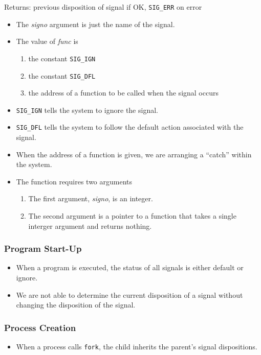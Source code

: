\documentclass[]{article}
\newcommand{\code}{\texttt}
\begin{document}
Returns: previous disposition of signal if OK, \code{SIG\_ERR} on error

\begin{itemize}
\item The \emph{signo} argument is just the name of the signal.
\item The value of \emph{func} is
\begin{enumerate}
\item the constant \code{SIG\_IGN}
\item the constant \code{SIG\_DFL}
\item the address of a function to be called when the signal occurs
\end{enumerate}
\item \code{SIG\_IGN} tells the system to ignore the signal.
\item \code{SIG\_DFL} tells the system to follow the default action associated
with the signal.
\item When the address of a function is given, we are arranging a ``catch''
within the system.
\item The function requires two arguments
\begin{enumerate}
\item The first argument, \emph{signo}, is an integer.
\item The second argument is a pointer to a function that takes a single
interger argument and returns nothing.
\end{enumerate}
\end{itemize}

\subsubsection*{Program Start-Up}
\begin{itemize}
\item When a program is executed, the status of all signals is either default or
ignore.
\item We are not able to determine the current disposition of a signal without
changing the disposition of the signal.
\end{itemize}

\subsubsection*{Process Creation}
\begin{itemize}
\item When a process calls \code{fork}, the child inherits the parent's signal
dispositions.
\end{itemize}
\end{document}
